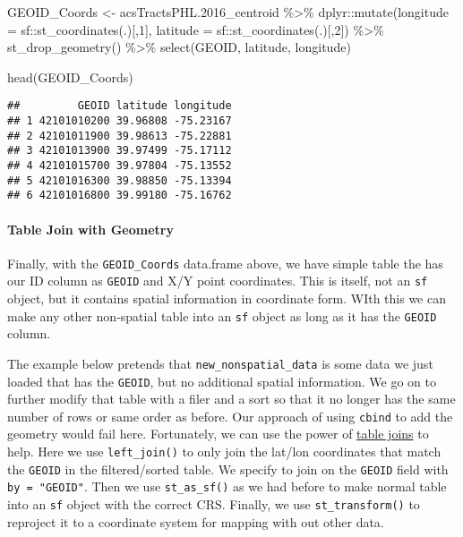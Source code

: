 \documentclass[
]{article}
\newenvironment{Shaded}{\begin{snugshade}}{\end{snugshade}}
\newcommand{\AttributeTok}[1]{\textcolor[rgb]{0.77,0.63,0.00}{#1}}
\newcommand{\DecValTok}[1]{\textcolor[rgb]{0.00,0.00,0.81}{#1}}
\newcommand{\FloatTok}[1]{\textcolor[rgb]{0.00,0.00,0.81}{#1}}
\newcommand{\FunctionTok}[1]{\textcolor[rgb]{0.00,0.00,0.00}{#1}}
\newcommand{\NormalTok}[1]{#1}
\newcommand{\OtherTok}[1]{\textcolor[rgb]{0.56,0.35,0.01}{#1}}
\newcommand{\SpecialCharTok}[1]{\textcolor[rgb]{0.00,0.00,0.00}{#1}}
\begin{document}
\begin{Shaded}
\begin{Highlighting}[]
\NormalTok{GEOID\_Coords }\OtherTok{\textless{}{-}}\NormalTok{ acsTractsPHL}\FloatTok{.2016}\NormalTok{\_centroid }\SpecialCharTok{\%\textgreater{}\%}
\NormalTok{  dplyr}\SpecialCharTok{::}\FunctionTok{mutate}\NormalTok{(}\AttributeTok{longitude =}\NormalTok{ sf}\SpecialCharTok{::}\FunctionTok{st\_coordinates}\NormalTok{(.)[,}\DecValTok{1}\NormalTok{],}
                \AttributeTok{latitude =}\NormalTok{ sf}\SpecialCharTok{::}\FunctionTok{st\_coordinates}\NormalTok{(.)[,}\DecValTok{2}\NormalTok{]) }\SpecialCharTok{\%\textgreater{}\%} 
  \FunctionTok{st\_drop\_geometry}\NormalTok{() }\SpecialCharTok{\%\textgreater{}\%} 
  \FunctionTok{select}\NormalTok{(GEOID, latitude, longitude)}

\FunctionTok{head}\NormalTok{(GEOID\_Coords)}
\end{Highlighting}
\end{Shaded}

\begin{verbatim}
##         GEOID latitude longitude
## 1 42101010200 39.96808 -75.23167
## 2 42101011900 39.98613 -75.22881
## 3 42101013900 39.97499 -75.17112
## 4 42101015700 39.97804 -75.13552
## 5 42101016300 39.98850 -75.13394
## 6 42101016800 39.99180 -75.16762
\end{verbatim}

\hypertarget{table-join-with-geometry}{%
\paragraph{Table Join with Geometry}\label{table-join-with-geometry}}

Finally, with the \texttt{GEOID\_Coords} data.frame above, we have
simple table the has our ID column as \texttt{GEOID} and X/Y point
coordinates. This is itself, not an \texttt{sf} object, but it contains
spatial information in coordinate form. WIth this we can make any other
non-spatial table into an \texttt{sf} object as long as it has the
\texttt{GEOID} column.

The example below pretends that \texttt{new\_nonspatial\_data} is some
data we just loaded that has the \texttt{GEOID}, but no additional
spatial information. We go on to further modify that table with a filer
and a sort so that it no longer has the same number of rows or same
order as before. Our approach of using \texttt{cbind} to add the
geometry would fail here. Fortunately, we can use the power of
\href{https://stat545.com/join-cheatsheet.html}{table joins} to help.
Here we use \texttt{left\_join()} to only join the lat/lon coordinates
that match the \texttt{GEOID} in the filtered/sorted table. We specify
to join on the \texttt{GEOID} field with \texttt{by\ =\ "GEOID"}. Then
we use \texttt{st\_as\_sf()} as we had before to make normal table into
an \texttt{sf} object with the correct CRS. Finally, we use
\texttt{st\_transform()} to reproject it to a coordinate system for
mapping with out other data.
\end{document}
